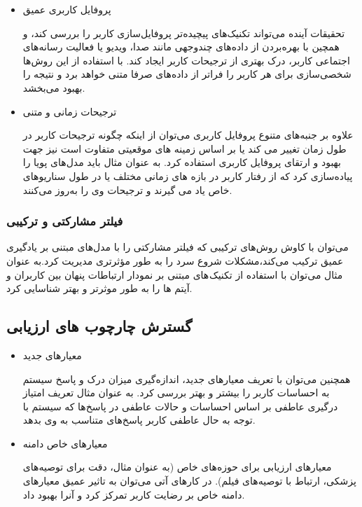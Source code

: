 \begin{itemize}
\item
 پروفایل کاربری عمیق

 تحقیقات آینده می‌تواند تکنیک‌های پیچیده‌تر پروفایل‌سازی کاربر را بررسی کند، و همچین با بهره‌بردن از داده‌های چندوجهی مانند صدا، ویدیو یا فعالیت رسانه‌های اجتماعی کاربر، درک بهتری از ترجیحات کاربر ایجاد کند.
با استفاده از این روش‌ها شخصی‌سازی برای هر کاربر را فراتر از داده‌های صرفا متنی خواهد برد و نتیجه را بهبود می‌بخشد.
\item
 ترجیحات زمانی و متنی

 علاوه بر جنبه‌های متنوع پروفایل ‌کاربری می‌توان از اینکه چگونه ترجیحات کاربر در طول زمان تغییر می کند یا بر اساس زمینه های موقعیتی متفاوت است نیز جهت بهبود و ارتقای پروفایل کاربری استفاده کرد.
به عنوان مثال باید مدل‌های پویا را پیاده‌سازی کرد که از رفتار کاربر در بازه های زمانی مختلف یا در طول سناریوهای خاص یاد می گیرند و ترجیحات وی را به‌روز می‌کنند.
\end{itemize}

\subsubsection{فیلتر مشارکتی و ترکیبی}
می‌توان با کاوش روش‌های ترکیبی که فیلتر مشارکتی را با مدل‌های مبتنی بر یادگیری عمیق ترکیب می‌کند،مشکلات شروع سرد را به طور مؤثرتری مدیریت کرد.به عنوان مثال می‌توان با استفاده از تکنیک های مبتنی بر نمودار ارتباطات پنهان بین کاربران و آیتم ها را به طور موثرتر و بهتر شناسایی کرد.


\subsection{گسترش چارچوب های ارزیابی}

\begin{itemize}
\item
معیارهای جدید

همچنین می‌توان با تعریف معیارهای جدید، اندازه‌گیری میزان درک و پاسخ سیستم به احساسات کاربر را بیشتر و بهتر بررسی کرد. به عنوان مثال تعریف امتیاز درگیری عاطفی بر اساس احساسات و حالات عاطفی در پاسخ‌ها که سیستم با توجه به حال عاطفی کاربر پاسخ‌های متناسب به وی بدهد.
\item
 معیارهای خاص دامنه

 معیارهای ارزیابی برای حوزه‌های خاص (به عنوان مثال، دقت برای توصیه‌های پزشکی، ارتباط با توصیه‌های فیلم). در کارهای آتی می‌توان به تاثیر عمیق معیارهای دامنه خاص بر رضایت کاربر تمرکز کرد و آنرا بهبود داد.
\end{itemize}

